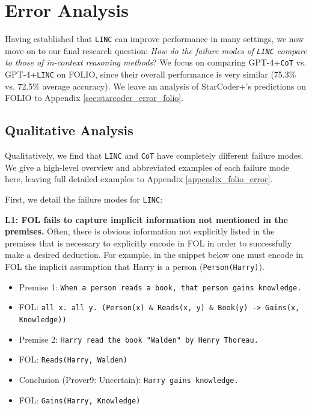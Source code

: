 \documentclass[11pt]{article}
\begin{document}
\section{Error Analysis}
\label{sec:error_analysis}
Having established that \texttt{LINC} can improve performance in many settings, we now move on to our final research question:
\textit{How do the failure modes of \texttt{LINC} compare to those of in-context reasoning methods}?
We focus on comparing GPT-4+\texttt{CoT} vs. GPT-4+\texttt{LINC} on FOLIO, since their overall performance is very similar (75.3\% vs. 72.5\% average accuracy). We leave an analysis of StarCoder+'s predictions on FOLIO to Appendix \ref{sec:starcoder_error_folio}.

\subsection{Qualitative Analysis} \label{sec:error_qualitative}
Qualitatively, we find that \texttt{LINC} and \texttt{CoT} have completely different failure modes. We give a high-level overview and abbreviated examples of each failure mode here, leaving full detailed examples to Appendix \ref{appendix_folio_error}.

First, we detail the failure modes for \texttt{LINC}:

\textbf{L1: FOL fails to capture implicit information not mentioned in the premises.} Often, there is obvious information not explicitly listed in the premises that is necessary to explicitly encode in FOL in order to successfully make a desired deduction. For example, in the snippet below one must encode in FOL the implicit assumption that Harry is a person (\texttt{Person(Harry)}).

\begin{itemize}
\itemsep0.1em
    \item[] \small Premise 1: \texttt{When a person reads a book, that person gains knowledge.}
    \item[] \small FOL: \texttt{all x. all y. (Person(x) \& Reads(x, y) \& Book(y) -> Gains(x, Knowledge))}
    \item[] \small Premise 2: \texttt{Harry read the book "Walden" by Henry Thoreau.}
    \item[] \small FOL: \texttt{Reads(Harry, Walden)}
    \item[] \small Conclusion (Prover9: Uncertain): \texttt{Harry gains knowledge.}
    \item[] \small FOL: \texttt{Gains(Harry, Knowledge)}
\end{itemize}
\end{document}

